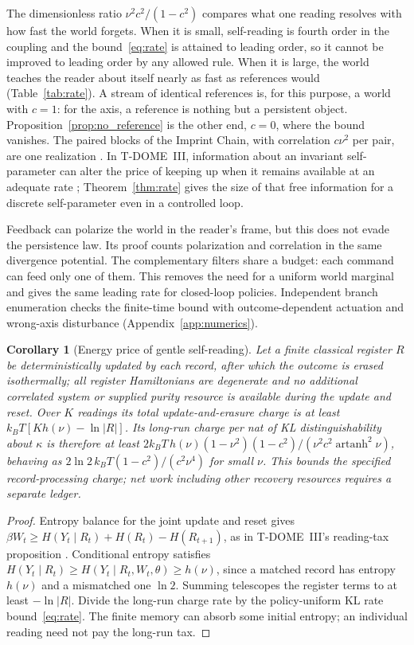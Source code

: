 \documentclass[11pt,a4paper]{article}
\newtheorem{corollary}[definition]{Corollary}
\newcommand{\artanh}{\operatorname{artanh}}
\begin{document}
The dimensionless ratio $\nu^2c^2/(1-c^2)$ compares what one reading resolves with how fast the world forgets. When it is small, self-reading is fourth order in the coupling and the bound~\eqref{eq:rate} is attained to leading order, so it cannot be improved to leading order by any allowed rule. When it is large, the world teaches the reader about itself nearly as fast as references would (Table~\ref{tab:rate}). A stream of identical references is, for this purpose, a world with $c=1$: for the axis, a reference is nothing but a persistent object. Proposition~\ref{prop:no_reference} is the other end, $c=0$, where the bound vanishes. The paired blocks of the Imprint Chain, with correlation $c\nu^2$ per pair, are one realization \cite{ImprintChain}. In T-DOME~III, information about an invariant self-parameter can alter the price of keeping up when it remains available at an adequate rate \cite{TDIII}; Theorem~\ref{thm:rate} gives the size of that free information for a discrete self-parameter even in a controlled loop.

Feedback can polarize the world in the reader's frame, but this does not evade the persistence law. Its proof counts polarization and correlation in the same divergence potential. The complementary filters share a budget: each command can feed only one of them. This removes the need for a uniform world marginal and gives the same leading rate for closed-loop policies. Independent branch enumeration checks the finite-time bound with outcome-dependent actuation and wrong-axis disturbance (Appendix~\ref{app:numerics}).

\begin{corollary}[Energy price of gentle self-reading]\label{cor:energy}
Let a finite classical register $R$ be deterministically updated by each record, after which the outcome is erased isothermally; all register Hamiltonians are degenerate and no additional correlated system or supplied purity resource is available during the update and reset. Over $K$ readings its total update-and-erasure charge is at least $k_BT[K h(\nu)-\ln|R|]$. Its long-run charge per nat of KL distinguishability about $\kappa$ is therefore at least $2k_BT\,h(\nu)(1-\nu^2)(1-c^2)/(\nu^2c^2\artanh^2\nu)$, behaving as $2\ln2\,k_BT(1-c^2)/(c^2\nu^4)$ for small $\nu$. This bounds the specified record-processing charge; net work including other recovery resources requires a separate ledger.
\end{corollary}
\begin{proof}
Entropy balance for the joint update and reset gives $\beta W_t\ge H(Y_t\mid R_t)+H(R_t)-H(R_{t+1})$, as in T-DOME~III's reading-tax proposition \cite{TDIII}. Conditional entropy satisfies $H(Y_t\mid R_t)\ge H(Y_t\mid R_t,W_t,\theta)\ge h(\nu)$, since a matched record has entropy $h(\nu)$ and a mismatched one $\ln2$. Summing telescopes the register terms to at least $-\ln|R|$. Divide the long-run charge rate by the policy-uniform KL rate bound~\eqref{eq:rate}. The finite memory can absorb some initial entropy; an individual reading need not pay the long-run tax.
\end{proof}
\end{document}
